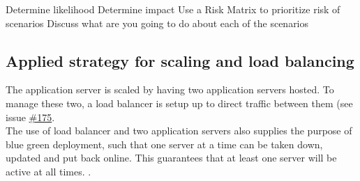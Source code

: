 Determine likelihood
Determine impact
Use a Risk Matrix to prioritize risk of scenarios
Discuss what are you going to do about each of the scenarios



\subsection{Applied strategy for scaling and load balancing}
The application server is scaled by having two application servers hosted. To manage these two, a load balancer is setup up to direct traffic between them (see issue \href{https://github.com/DevelOpsITU/MiniTwit/issues/175}{\#175}. \\
The use of load balancer and two application servers also supplies the purpose of blue green deployment, such that one server at a time can be taken down, updated and put back online. This guarantees that at least one server will be active at all times.  \cite{blue_green_deployment}.

